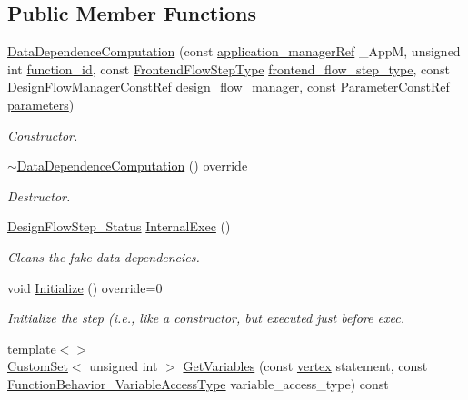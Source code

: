 \subsection*{Public Member Functions}
\begin{DoxyCompactItemize}
\item 
\hyperlink{classDataDependenceComputation_a286a5513c200ec9e73819d00b8629598}{Data\+Dependence\+Computation} (const \hyperlink{application__manager_8hpp_a04ccad4e5ee401e8934306672082c180}{application\+\_\+manager\+Ref} \+\_\+\+AppM, unsigned int \hyperlink{classFunctionFrontendFlowStep_a58ef2383ad1a212a8d3f396625a4b616}{function\+\_\+id}, const \hyperlink{frontend__flow__step_8hpp_afeb3716c693d2b2e4ed3e6d04c3b63bb}{Frontend\+Flow\+Step\+Type} \hyperlink{classFrontendFlowStep_ad49067d6a17119d47316149ab757b60d}{frontend\+\_\+flow\+\_\+step\+\_\+type}, const Design\+Flow\+Manager\+Const\+Ref \hyperlink{classDesignFlowStep_ab770677ddf087613add30024e16a5554}{design\+\_\+flow\+\_\+manager}, const \hyperlink{Parameter_8hpp_a37841774a6fcb479b597fdf8955eb4ea}{Parameter\+Const\+Ref} \hyperlink{classDesignFlowStep_a802eaafe8013df706370679d1a436949}{parameters})
\begin{DoxyCompactList}\small\item\em Constructor. \end{DoxyCompactList}\item 
\hyperlink{classDataDependenceComputation_ae296f81ebc870952dac5cad0b1da27ad}{$\sim$\+Data\+Dependence\+Computation} () override
\begin{DoxyCompactList}\small\item\em Destructor. \end{DoxyCompactList}\item 
\hyperlink{design__flow__step_8hpp_afb1f0d73069c26076b8d31dbc8ebecdf}{Design\+Flow\+Step\+\_\+\+Status} \hyperlink{classDataDependenceComputation_a573697b6cf02065e9365aee8e208fdc1}{Internal\+Exec} ()
\begin{DoxyCompactList}\small\item\em Cleans the fake data dependencies. \end{DoxyCompactList}\item 
void \hyperlink{classDataDependenceComputation_adeeabf6602796c390b4e331e553c71b9}{Initialize} () override=0
\begin{DoxyCompactList}\small\item\em Initialize the step (i.\+e., like a constructor, but executed just before exec. \end{DoxyCompactList}\item 
{\footnotesize template$<$$>$ }\\\hyperlink{custom__set_8hpp_a615bc2f42fc38a4bb1790d12c759e86f}{Custom\+Set}$<$ unsigned int $>$ \hyperlink{classDataDependenceComputation_a3c07664d77f1db17cd033b086900bba0}{Get\+Variables} (const \hyperlink{graph_8hpp_abefdcf0544e601805af44eca032cca14}{vertex} statement, const \hyperlink{function__behavior_8hpp_a68c28bfcfefbe63cece191e941af0409}{Function\+Behavior\+\_\+\+Variable\+Access\+Type} variable\+\_\+access\+\_\+type) const
\end{DoxyCompactItemize}
